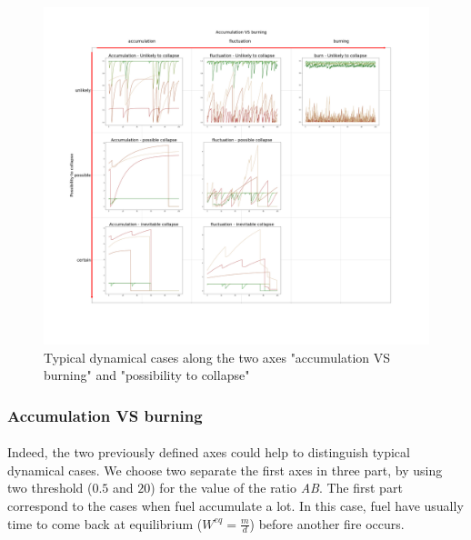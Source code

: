 \documentclass{article}
\begin{document}
\begin{figure}[h!]
\centering
\includegraphics[width=12cm]{results/time_series_each_cases.png}
\caption{Typical dynamical cases along the two axes "accumulation VS burning" and "possibility to collapse"}
\end{figure}


\subsubsection{Accumulation VS burning}

\paragraph{}
Indeed, the two previously defined axes could help to distinguish typical dynamical cases. We choose two separate the first axes in three part, by using two threshold ($0.5$ and $20$) for the value of the ratio \textit{AB}. The first part correspond to the cases when fuel accumulate a lot. In this case, fuel have usually time to come back at equilibrium ($W^{eq}=\frac{m}{d}$) before another fire occurs.
\end{document}
